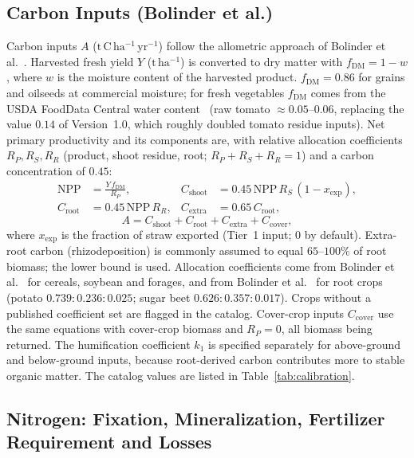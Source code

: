 \subsection{Carbon Inputs (Bolinder et al.)}
Carbon inputs $A$ ($\mathrm{t\,C\,ha^{-1}\,yr^{-1}}$) follow the allometric approach of Bolinder et al.~\cite{bolinder2007approach}. Harvested fresh yield $Y$ ($\mathrm{t\,ha^{-1}}$) is converted to dry matter with $f_{\mathrm{DM}} = 1 - w$, where $w$ is the moisture content of the harvested product. $f_{\mathrm{DM}} = 0.86$ for grains and oilseeds at commercial moisture; for fresh vegetables $f_{\mathrm{DM}}$ comes from the USDA FoodData Central water content~\cite{usda_fdc} (raw tomato $\approx 0.05$--$0.06$, replacing the value $0.14$ of Version~1.0, which roughly doubled tomato residue inputs). Net primary productivity and its components are, with relative allocation coefficients $R_P, R_S, R_R$ (product, shoot residue, root; $R_P + R_S + R_R = 1$) and a carbon concentration of $0.45$:
\begin{align}
  \mathrm{NPP} &= \frac{Y\, f_{\mathrm{DM}}}{R_P}, &
  C_{\mathrm{shoot}} &= 0.45\, \mathrm{NPP}\, R_S\, (1 - x_{\mathrm{exp}}), \\
  C_{\mathrm{root}} &= 0.45\, \mathrm{NPP}\, R_R, &
  C_{\mathrm{extra}} &= 0.65\, C_{\mathrm{root}},
\end{align}
\begin{equation}
  A = C_{\mathrm{shoot}} + C_{\mathrm{root}} + C_{\mathrm{extra}} + C_{\mathrm{cover}},
\end{equation}
where $x_{\mathrm{exp}}$ is the fraction of straw exported (Tier~1 input; $0$ by default). Extra-root carbon (rhizodeposition) is commonly assumed to equal $65$--$100\%$ of root biomass; the lower bound is used. Allocation coefficients come from Bolinder et al.~\cite{bolinder2007approach} for cereals, soybean and forages, and from Bolinder et al.~\cite{bolinder2015root} for root crops (potato $0.739{:}0.236{:}0.025$; sugar beet $0.626{:}0.357{:}0.017$). Crops without a published coefficient set are flagged in the catalog. Cover-crop inputs $C_{\mathrm{cover}}$ use the same equations with cover-crop biomass and $R_P = 0$, all biomass being returned. The humification coefficient $k_1$ is specified separately for above-ground and below-ground inputs, because root-derived carbon contributes more to stable organic matter. The catalog values are listed in Table~\ref{tab:calibration}.

\subsection{Nitrogen: Fixation, Mineralization, Fertilizer Requirement and Losses}
